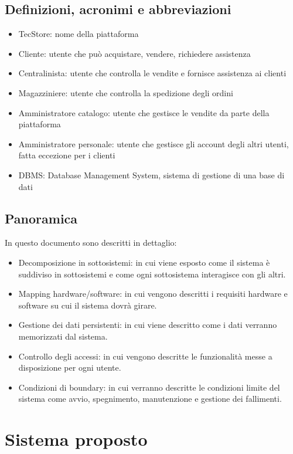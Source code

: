 \documentclass[12pt,a4paper]{article}
\begin{document}
\subsection{Definizioni, acronimi e abbreviazioni}
\begin{itemize}
\item TecStore: nome della piattaforma 
\item Cliente: utente che può acquistare, vendere, richiedere assistenza
\item Centralinista: utente che controlla le vendite e fornisce assistenza ai clienti
\item Magazziniere: utente che controlla la spedizione degli ordini
\item Amministratore catalogo: utente che gestisce le vendite da parte della piattaforma
\item Amministratore personale: utente che gestisce gli account degli altri utenti, fatta eccezione per i clienti
\item DBMS: Database Management System, sistema di gestione di una base di dati
\end{itemize}

\subsection{Panoramica}
In questo documento sono descritti in dettaglio:

\begin{itemize}
\item Decomposizione in sottosistemi: in cui viene esposto come il sistema è suddiviso in sottosistemi e come ogni sottosistema interagisce con gli altri.
\item Mapping hardware/software: in cui vengono descritti i requisiti hardware e software su cui il sistema dovrà girare.
\item Gestione dei dati persistenti: in cui viene descritto come i dati verranno memorizzati dal sistema.
\item Controllo degli accessi: in cui vengono descritte le funzionalità messe a disposizione per ogni utente.
\item Condizioni di boundary: in cui verranno descritte le condizioni limite del sistema come avvio, spegnimento, manutenzione e gestione dei fallimenti.
\end{itemize}

\section{Sistema proposto}
\end{document}
